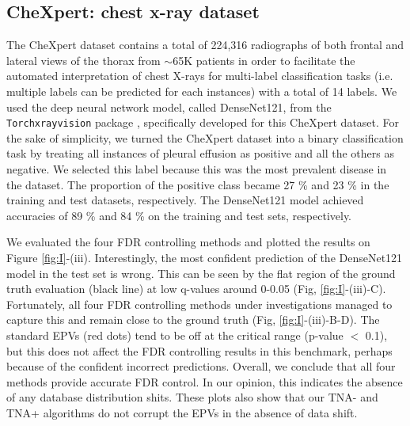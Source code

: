 \documentclass{article}
\begin{document}
\subsection{CheXpert: chest x-ray dataset}

The CheXpert dataset contains a total of 224,316 radiographs of both frontal and lateral views of the thorax from $\sim$65K patients in order to facilitate the automated interpretation of chest X-rays for multi-label classification tasks (i.e. multiple labels can be predicted for each instances) with a total of 14 labels. We used the deep neural network model, called DenseNet121, from the \texttt{Torchxrayvision} package \cite{cohen2020limits,Cohen2022xrv}, specifically developed for this CheXpert dataset. For the sake of simplicity, we turned the CheXpert dataset into a binary classification task by treating all instances of pleural effusion as positive and all the others as negative. We selected this label because this was the most prevalent  disease in the dataset. The proportion of the positive class became 27 \% and 23 \% in the training and test datasets, respectively. The DenseNet121 model achieved accuracies of 89 \% and 84 \% on the training and test sets, respectively.

We evaluated the four FDR controlling methods and plotted the results on Figure \ref{fig:I}-(iii). Interestingly, the most confident prediction of the DenseNet121 model in the test set is wrong. This can be seen by the flat region of the ground truth evaluation (black line) at low q-values around 0-0.05 (Fig, \ref{fig:I}-(iii)-C). Fortunately, all four FDR controlling methods under investigations managed to capture this and remain close to the ground truth (Fig, \ref{fig:I}-(iii)-B-D). The standard EPVs (red dots) tend to be off at the critical range (p-value $<$ 0.1), but this does not affect the FDR controlling results in this benchmark, perhaps because of the confident incorrect predictions. Overall, we conclude that all four methods provide accurate FDR control. In our opinion, this indicates the absence of any database distribution shits. These plots also show that our TNA- and TNA+ algorithms do not corrupt  the EPVs in the absence of data shift.
\end{document}
